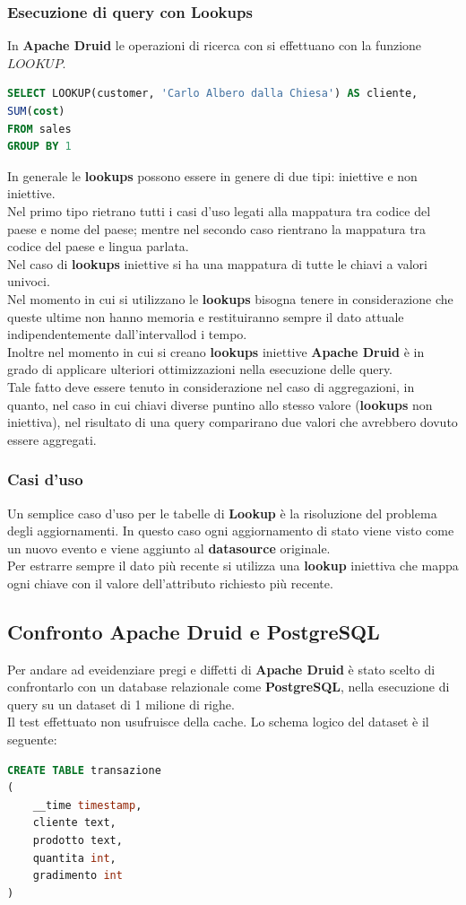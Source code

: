 \documentclass{article}
\begin{document}
\subsubsection{Esecuzione di query con Lookups}
In \textbf{Apache Druid} le operazioni di ricerca con si effettuano con la funzione $LOOKUP$.
\begin{lstlisting}[language=SQL,showstringspaces=false,]
SELECT LOOKUP(customer, 'Carlo Albero dalla Chiesa') AS cliente, 
SUM(cost)
FROM sales
GROUP BY 1
\end{lstlisting}
In generale le \textbf{lookups} possono essere in genere di due tipi: iniettive e non iniettive. \\
Nel primo tipo rietrano tutti i casi d'uso legati alla mappatura tra codice del paese e nome del paese; mentre nel secondo caso rientrano la mappatura tra codice del paese e lingua parlata.\\
Nel caso di \textbf{lookups} iniettive si ha una mappatura di tutte le chiavi a valori univoci.\\
Nel momento in cui si utilizzano le \textbf{lookups} bisogna tenere in considerazione che queste ultime non hanno memoria e restituiranno sempre il dato attuale indipendentemente dall'intervallod i tempo.\\
Inoltre nel momento in cui si creano \textbf{lookups} iniettive \textbf{Apache Druid} è in grado di applicare ulteriori ottimizzazioni nella esecuzione delle query.\\
Tale fatto deve essere tenuto in considerazione nel caso di aggregazioni, in quanto, nel caso in cui chiavi diverse puntino allo stesso valore (\textbf{lookups} non iniettiva), nel risultato di una query comparirano due valori che avrebbero dovuto essere aggregati.
\subsubsection{Casi d'uso}
Un semplice caso d'uso per le tabelle di \textbf{Lookup} è la risoluzione del problema degli aggiornamenti. In questo caso ogni aggiornamento di stato viene visto come un nuovo evento e viene aggiunto al \textbf{datasource} originale.\\
Per estrarre sempre il dato più recente si utilizza una \textbf{lookup} iniettiva che mappa ogni chiave con il valore dell'attributo richiesto più recente.
\subsection{Confronto Apache Druid e PostgreSQL}
Per andare ad eveidenziare pregi e diffetti di \textbf{Apache Druid} è stato scelto di confrontarlo con un database relazionale come \textbf{PostgreSQL}, nella esecuzione di query su un dataset di 1 milione di righe.\\
Il test effettuato non usufruisce della cache.
Lo schema logico del dataset è il seguente:
\begin{lstlisting}[language=SQL]
    CREATE TABLE transazione
(
    __time timestamp,
    cliente text,
    prodotto text,
    quantita int,
    gradimento int
)

\end{lstlisting}
\end{document}
